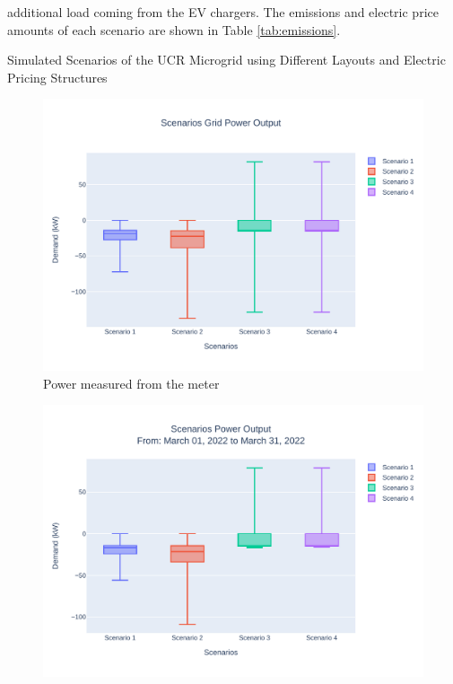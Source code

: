 \documentclass[conference]{IEEEtran}
\begin{document}
additional load coming from the EV chargers. The emissions and electric price amounts of each scenario are shown in Table \ref{tab:emissions}.
	\begin{table}[H]
		\caption{Simulated Scenarios of the UCR Microgrid using Different Layouts and Electric Pricing Structures}
		\tiny
		
		\normalsize
		\label{tab:scenarios}
	\end{table}
	
	\begin{figure}[H]
		\centering
		\includegraphics[width=0.9\linewidth]{Fig/scenarios_power_output_boxplot}
		\caption{Power measured from the meter}
		\label{fig:scenariospoweroutputboxplot}
	\end{figure}
	
	\begin{figure}[H]
		\centering
		\includegraphics[width=1\linewidth]{Fig/0_Scn_Output_Run_2_Mar_01_2022_to_Mar_31_2022}
		\caption{}
		\label{fig:0scnoutputrun2mar012022tomar312022}
	\end{figure}
\end{document}
